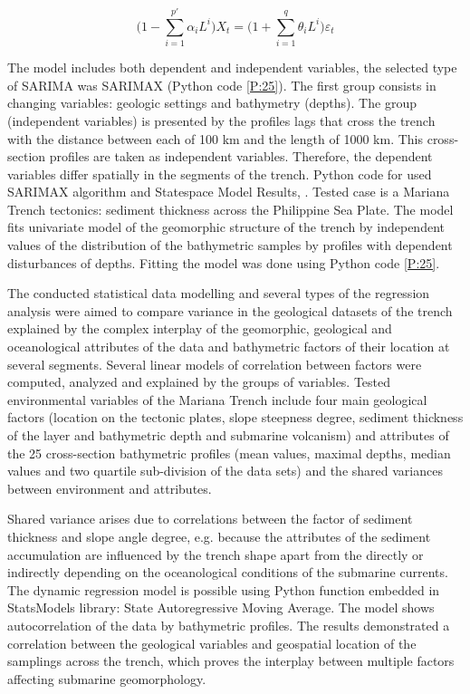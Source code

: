 \documentclass[11pt,a4paper]{report}
\newcommand{\myequations}[1]{%
\addcontentsline{equ}{myequations}{\protect\numberline{\theequation}#1}\par}
\begin{document}
{\begin{equation}
	\Bigg(1-\sum_{i=1}^{p'}\alpha_{i}L^{i}\Bigg)X_{t}=\Bigg(1+\sum_{i=1}^{q}\theta_{i}L^{i}\Bigg)\varepsilon_{t}
\end{equation}\label{eq:sar}\myequations{Dynamic regression model (SARIMA) definition}

The model includes both dependent and independent variables, the selected type of \ac{SARIMA} was \ac{SARIMA}X (Python code \ref{P:25}). The first group consists in changing variables: geologic settings and bathymetry (depths). The  group (independent variables) is presented by the profiles lags that cross the trench with the distance between each of 100 km and the length of 1000 km. This cross-section profiles are taken as independent variables. Therefore, the dependent variables differ spatially in the segments of the trench. Python code for used \ac{SARIMA}X algorithm and Statespace Model Results, \cite{Lemenkova201989}. Tested case is a Mariana Trench tectonics: sediment thickness across the Philippine Sea Plate. The model fits univariate model of the geomorphic structure of the trench by independent values of the distribution of the bathymetric samples by profiles with dependent disturbances of depths. Fitting the model was done using Python code \ref{P:25}.
	
The conducted statistical data modelling and several types of the regression analysis were aimed to compare variance in the geological datasets of the trench explained by the complex interplay of the geomorphic, geological and oceanological attributes of the data and bathymetric factors of their location at several segments. Several linear models of correlation between factors were computed, analyzed and explained by the groups of variables. Tested environmental variables of the Mariana Trench include four main geological factors (location on the tectonic plates, slope steepness degree, sediment thickness of the layer and bathymetric depth and submarine volcanism) and attributes of the 25 cross-section bathymetric profiles (mean values, maximal depths, median values and two quartile sub-division of the data sets) and the shared variances between environment and attributes. 

Shared variance arises due to correlations between the factor of sediment thickness and slope angle degree, e.g. because the attributes of the sediment accumulation are influenced by the trench shape apart from the directly or indirectly depending on the oceanological conditions of the submarine currents. The dynamic regression model is possible using Python function embedded in \ac{StatsModels} library: State Autoregressive Moving Average. The model shows autocorrelation of the data by bathymetric profiles. The results demonstrated a correlation between the geological variables and geospatial location of the samplings across the trench, which proves the interplay between multiple factors affecting submarine geomorphology.
 
}
\end{document}
